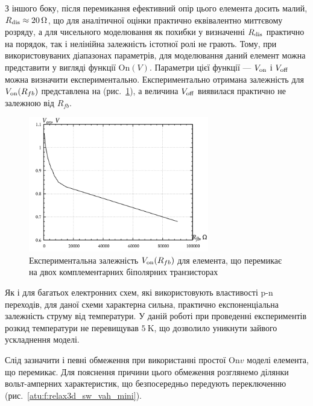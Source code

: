 З іншого боку, після перемикання ефективний опір цього елемента досить малий,
$R _\mathrm{dis} \approx \SI{20}{\ohm} $, що для аналітичної оцінки практично
еквівалентно миттєвому розряду, а для чисельного моделювання
як похибки у визначенні
$R _\mathrm{dis} $ практично на порядок, так і нелінійна залежність
істотної ролі не грають. Тому, при використовуваних діапазонах
параметрів, для моделювання даний елемент можна представити
у вигляді функції
$\mathrm{On} (V) $. Параметри цієї функції ---
$V _\mathrm{on} $ і
$V _\mathrm{off} $ можна визначити експериментально. Експериментально
отримана залежність для
$V _\mathrm{on} (R_{fb}) $ представлена на (рис.~\ref{atu:f:relax3d_bjt_v_onn}), а
величина
$V _\mathrm{off} $ виявилася практично не залежною від
$R_{fb} $.

\begin{figure}[htb!]
  \centerline{\includegraphics[width=0.7\textwidth]{p/r_fb-V_on.png} }
\caption{Експериментальна залежність $ V _\mathrm{on} (R_{fb}) $ для елемента, що перемикає на двох комплементарних біполярних транзисторах}
\label{atu:f:relax3d_bjt_v_onn}
\end{figure}

Як і для багатьох електронних схем, які використовують
властивості p-n переходів, для даної схеми характерна сильна,
практично експоненціальна залежність струму від температури. У
даній роботі при проведенні експериментів розкид температури
не перевищував
$\SI{5}{\kelvin} $, що дозволило уникнути зайвого ускладнення моделі.


Слід зазначити і певні обмеження при використанні простої
$\mathrm{On}{v} $ моделі елемента, що перемикає. Для пояснення
причини цього обмеження розглянемо ділянки вольт-амперних
характеристик, що безпосередньо передують переключенню
(рис.~\ref{atu:f:relax3d_sw_vah_mini}).


